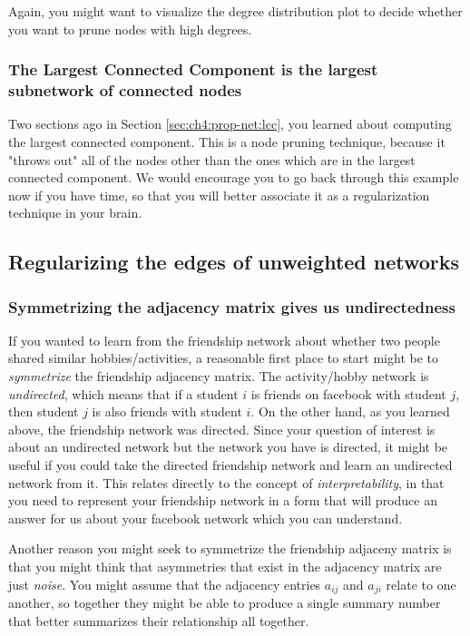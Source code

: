 Again, you might want to visualize the degree distribution plot to decide whether you want to prune nodes with high degrees.

\subsubsection{The Largest Connected Component is the largest subnetwork of connected nodes}

Two sections ago in Section \ref{sec:ch4:prop-net:lcc}, you learned about computing the largest connected component. This is a node pruning technique, because it "throws out" all of the nodes other than the ones which are in the largest connected component. We would encourage you to go back through this example now if you have time, so that you will better associate it as a regularization technique in your brain.


\subsection{Regularizing the edges of unweighted networks}

\subsubsection{Symmetrizing the adjacency matrix gives us undirectedness}
\label{sec:ch4:regularization:symmetrize}
If you wanted to learn from the friendship network about whether two people shared similar hobbies/activities, a reasonable first place to start might be to \emph{symmetrize} the friendship adjacency matrix. The activity/hobby network is \emph{undirected}, which means that if a student $i$ is friends on facebook with student $j$, then student $j$ is also friends with student $i$. On the other hand, as you learned above, the friendship network was directed. Since your question of interest is about an undirected network but the network you have is directed, it might be useful if you could take the directed friendship network and learn an undirected network from it. This relates directly to the concept of \emph{interpretability}, in that you need to represent your friendship network in a form that will produce an answer for us about your facebook network which you can understand.

Another reason you might seek to symmetrize the friendship adjaceny matrix is that you might think that asymmetries that exist in the adjacency matrix are just \emph{noise}. You might assume that the adjacency entries $a_{ij}$ and $a_{ji}$ relate to one another, so together they might be able to produce a single summary number that better summarizes their relationship all together. 

